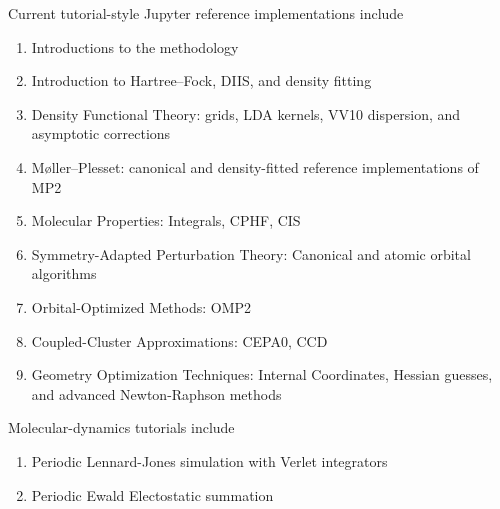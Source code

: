 \documentclass[journal=jctcce,manuscript=article]{achemso}
\newcommand{\pfour}{{\sc{Psi4}}\xspace}%
\newcommand{\pfn}{{\sc{Psi4NumPy}}\xspace}%
\begin{document}


Current tutorial-style Jupyter reference implementations include

\begin{enumerate}
\item Introductions to the \pfn methodology
\item Introduction to Hartree--Fock, DIIS, and density fitting
\item Density Functional Theory: grids, LDA kernels, VV10 dispersion, and asymptotic corrections
\item M\o ller--Plesset: canonical and density-fitted reference implementations of MP2
\item Molecular Properties: Integrals, CPHF, CIS
\item Symmetry-Adapted Perturbation Theory: Canonical and atomic orbital algorithms
\item Orbital-Optimized Methods: OMP2
\item Coupled-Cluster Approximations: CEPA0, CCD
\item  Geometry Optimization Techniques: Internal Coordinates, Hessian guesses, and advanced Newton-Raphson methods
\end{enumerate}
Molecular-dynamics tutorials include
\begin{enumerate}
\item Periodic Lennard-Jones simulation with Verlet integrators
\item Periodic Ewald Electostatic summation
\end{enumerate}
\end{document}
